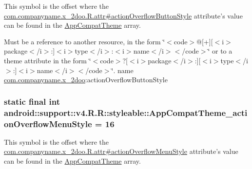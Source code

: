 This symbol is the offset where the \hyperlink{classcom_1_1companyname_1_1x__2doo_1_1_r_1_1attr_5621a921de85c2b7789c7e83cc781f1d}{com.companyname.x\_\-2doo.R.attr\#actionOverflowButtonStyle} attribute's value can be found in the \hyperlink{classandroid_1_1support_1_1v4_1_1_r_1_1styleable_0873e92ba21076bb5a4aeadeb7f5779f}{AppCompatTheme} array.

Must be a reference to another resource, in the form \char`\"{}$<$code$>$@\mbox{[}+\mbox{]}\mbox{[}$<$i$>$package$<$/i$>$:\mbox{]}$<$i$>$type$<$/i$>$:$<$i$>$name$<$/i$>$$<$/code$>$\char`\"{} or to a theme attribute in the form \char`\"{}$<$code$>$?\mbox{[}$<$i$>$package$<$/i$>$:\mbox{]}\mbox{[}$<$i$>$type$<$/i$>$:\mbox{]}$<$i$>$name$<$/i$>$$<$/code$>$\char`\"{}.  name \hyperlink{namespacecom_1_1companyname_1_1x__2doo}{com.companyname.x\_\-2doo}:actionOverflowButtonStyle \hypertarget{classandroid_1_1support_1_1v4_1_1_r_1_1styleable_a866c80182ecc37a2b36bd4b28132297}{
\subsubsection[{AppCompatTheme\_\-actionOverflowMenuStyle}]{\setlength{\rightskip}{0pt plus 5cm}static final int android::support::v4.R.R::styleable::AppCompatTheme\_\-actionOverflowMenuStyle = 16}}
\label{classandroid_1_1support_1_1v4_1_1_r_1_1styleable_a866c80182ecc37a2b36bd4b28132297}


This symbol is the offset where the \hyperlink{classcom_1_1companyname_1_1x__2doo_1_1_r_1_1attr_4c639720f9410fb0440f18797bf83998}{com.companyname.x\_\-2doo.R.attr\#actionOverflowMenuStyle} attribute's value can be found in the \hyperlink{classandroid_1_1support_1_1v4_1_1_r_1_1styleable_0873e92ba21076bb5a4aeadeb7f5779f}{AppCompatTheme} array.

